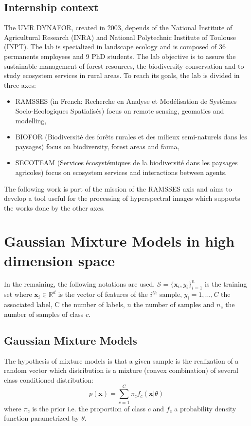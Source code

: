 \documentclass[a4paper,11pt,DIV=16,abstracton]{scrartcl}
\begin{document}
    \subsection{Internship context}

    The UMR DYNAFOR, created in 2003, depends of the National Institute of Agricultural Research (INRA) and National Polytechnic Institute of Toulouse (INPT). The lab is specialized in landscape ecology and is composed of 36 permanents employees and 9 PhD students. The lab objective is to assure the sustainable management of forest resources, the biodiversity conservation and to study ecosystem services in rural areas. To reach its goals, the lab is divided in three axes:
    \begin{itemize}
        \item RAMSSES (in French: Recherche en Analyse et Modélisation de Systèmes Socio-Ecologiques Spatialisés) focus on remote sensing, geomatics and modelling,
        \item BIOFOR (Biodiversité des forêts rurales et des milieux semi-naturels dans les paysages) focus on biodiversity, forest areas and fauna,
        \item SECOTEAM (Services écosystémiques de la biodiversité dans les paysages agricoles) focus on ecosystem services and interactions between agents.
    \end{itemize}

    The following work is part of the mission of the RAMSSES axis and aims to develop a tool useful for the processing of hyperspectral images which supports the works done by the other axes.

\section{Gaussian Mixture Models in high dimension space}
\label{sec:gmm-hd}

In the remaining, the following notations are used. $\mathcal{S} = \{\mathbf{x}_i,y_i\}_{i=1}^{n}$ is the training set where $\mathbf{x}_i \in \mathbb{R}^d$ is the vector of features of the $i^{th}$ sample, $y_i = 1,...,C$ the associated label, C the number of labels, $n$ the number of samples and $n_c$ the number of samples of class $c$.

    \subsection{Gaussian Mixture Models}

    The hypothesis of mixture models is that a given sample is the realization of a random vector which distribution is a mixture (convex combination) of several class conditioned distribution:
    \begin{equation}
        p(\mathbf{x}) = \sum_{c=1}^{C} \pi_c f_c(\mathbf{x}|\theta)
    \end{equation}
    where $\pi_c$ is the prior i.e. the proportion of class $c$ and $f_c$ a probability density function parametrized by $\theta$.
\end{document}
